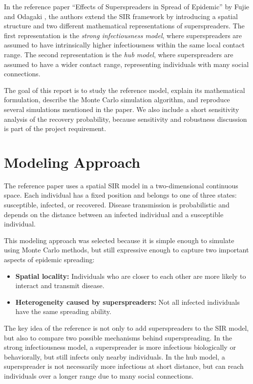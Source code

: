 \documentclass[11pt,a4paper]{article}
\begin{document}
In the reference paper ``Effects of Superspreaders in Spread of Epidemic'' by Fujie and Odagaki \cite{fujie2007}, the authors extend the SIR framework by introducing a spatial structure and two different mathematical representations of superspreaders. The first representation is the \textit{strong infectiousness model}, where superspreaders are assumed to have intrinsically higher infectiousness within the same local contact range. The second representation is the \textit{hub model}, where superspreaders are assumed to have a wider contact range, representing individuals with many social connections.

The goal of this report is to study the reference model, explain its mathematical formulation, describe the Monte Carlo simulation algorithm, and reproduce several simulations mentioned in the paper. We also include a short sensitivity analysis of the recovery probability, because sensitivity and robustness discussion is part of the project requirement.

\section{Modeling Approach}

The reference paper uses a spatial SIR model in a two-dimensional continuous space. Each individual has a fixed position and belongs to one of three states: susceptible, infected, or recovered. Disease transmission is probabilistic and depends on the distance between an infected individual and a susceptible individual.

This modeling approach was selected because it is simple enough to simulate using Monte Carlo methods, but still expressive enough to capture two important aspects of epidemic spreading:

\begin{itemize}[leftmargin=2em]
    \item \textbf{Spatial locality:} Individuals who are closer to each other are more likely to interact and transmit disease.
    \item \textbf{Heterogeneity caused by superspreaders:} Not all infected individuals have the same spreading ability.
\end{itemize}

The key idea of the reference is not only to add superspreaders to the SIR model, but also to compare two possible mechanisms behind superspreading. In the strong infectiousness model, a superspreader is more infectious biologically or behaviorally, but still infects only nearby individuals. In the hub model, a superspreader is not necessarily more infectious at short distance, but can reach individuals over a longer range due to many social connections.
\end{document}
